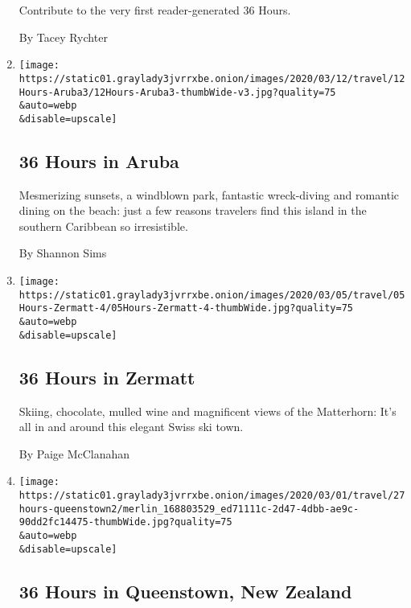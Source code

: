 \begin{enumerate}
  Contribute to the very first reader-generated 36 Hours.

  By Tacey Rychter
\item
  \href{/2020/03/12/travel/what-to-do-36-hours-in-aruba.html}{}

  \texttt{[image: https://static01.graylady3jvrrxbe.onion/images/2020/03/12/travel/12Hours-Aruba3/12Hours-Aruba3-thumbWide-v3.jpg?quality=75\\\&auto=webp\\\&disable=upscale]}

  \hypertarget{36-hours-in-aruba}{%
  \subsection{36 Hours in Aruba}\label{36-hours-in-aruba}}

  Mesmerizing sunsets, a windblown park, fantastic wreck-diving and
  romantic dining on the beach: just a few reasons travelers find this
  island in the southern Caribbean so irresistible.

  By Shannon Sims
\item
  \href{/2020/03/05/travel/what-to-do-36-hours-in-zermatt.html}{}

  \texttt{[image: https://static01.graylady3jvrrxbe.onion/images/2020/03/05/travel/05Hours-Zermatt-4/05Hours-Zermatt-4-thumbWide.jpg?quality=75\\\&auto=webp\\\&disable=upscale]}

  \hypertarget{36-hours-in-zermatt}{%
  \subsection{36 Hours in Zermatt}\label{36-hours-in-zermatt}}

  Skiing, chocolate, mulled wine and magnificent views of the
  Matterhorn: It's all in and around this elegant Swiss ski town.

  By Paige McClanahan
\item
  \href{/2020/02/27/travel/what-to-do-36-hours-in-queenstown.html}{}

  \texttt{[image: https://static01.graylady3jvrrxbe.onion/images/2020/03/01/travel/27hours-queenstown2/merlin\_168803529\_ed71111c-2d47-4dbb-ae9c-90dd2fc14475-thumbWide.jpg?quality=75\\\&auto=webp\\\&disable=upscale]}

  \hypertarget{36-hours-in-queenstown-new-zealand}{%
  \subsection{36 Hours in Queenstown, New
  Zealand}\label{36-hours-in-queenstown-new-zealand}}


\end{enumerate}
